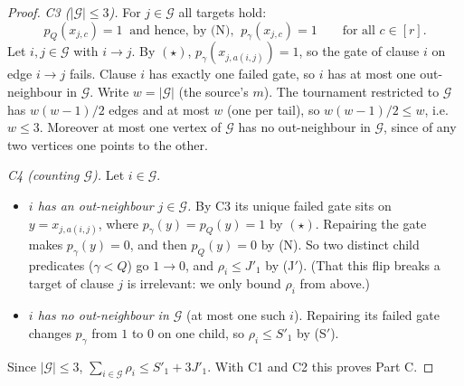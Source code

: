 \documentclass[11pt]{article}
\theoremstyle{definition}
\theoremstyle{remark}
\begin{document}
\begin{proof}
\emph{C3 ($|\mathcal G|\le3$).} For $j\in\mathcal G$ all targets hold:
\[
 p_Q(x_{j,c})=1\ \text{ and hence, by (N), }\ p_\gamma(x_{j,c})=1
 \qquad\text{for all }c\in[r].\tag{$\star$}
\]
Let $i,j\in\mathcal G$ with $i\to j$. By $(\star)$,
$p_\gamma(x_{j,a(i,j)})=1$, so the gate of clause $i$ on edge $i\to j$ fails.
Clause $i$ has exactly one failed gate, so $i$ has at most one out-neighbour
in $\mathcal G$. Write $w=|\mathcal G|$ (the source's $m$). The tournament
restricted to $\mathcal G$ has $w(w-1)/2$ edges and at most $w$ (one per
tail), so $w(w-1)/2\le w$, i.e.\ $w\le3$. Moreover at most one vertex of
$\mathcal G$ has no out-neighbour in $\mathcal G$, since of any two vertices
one points to the other.

\emph{C4 (counting $\mathcal G$).} Let $i\in\mathcal G$.
\begin{itemize}[leftmargin=*,itemsep=1pt]
\item[(a)] \emph{$i$ has an out-neighbour $j\in\mathcal G$.} By C3 its unique
 failed gate sits on $y=x_{j,a(i,j)}$, where $p_\gamma(y)=p_Q(y)=1$ by
 $(\star)$. Repairing the gate makes $p_\gamma(y)=0$, and then $p_Q(y)=0$ by
 (N). So two distinct child predicates ($\gamma<Q$) go $1\to0$, and
 $\rho_i\le J'_1$ by (J$'$). (That this flip breaks a target of clause $j$ is
 irrelevant: we only bound $\rho_i$ from above.)
\item[(b)] \emph{$i$ has no out-neighbour in $\mathcal G$} (at most one such
 $i$). Repairing its failed gate changes $p_\gamma$ from $1$ to $0$ on one
 child, so $\rho_i\le S'_1$ by (S$'$).
\end{itemize}
Since $|\mathcal G|\le3$, $\sum_{i\in\mathcal G}\rho_i\le S'_1+3J'_1$.
With C1 and C2 this proves Part C.


\end{proof}
\end{document}
